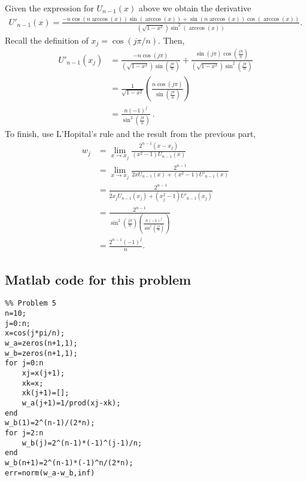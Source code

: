Given the expression for $U_{n-1}(x)$ above we obtain the derivative
\begin{align*}
U'_{n-1}(x) = \frac{-n\cos(n\arccos(x))\sin(\arccos(x)) + \sin(n\arccos(x))\cos(\arccos(x))}{\left(\sqrt{1 - x^2}\right)\sin^2(\arccos(x))}.
\end{align*}
Recall the definition of $x_j=\cos(j\pi/n)$. Then,
\begin{align*}
U'_{n-1}(x_j) & = \frac{-n\cos(j \pi)}{\left(\sqrt{1 - x^2}\right) \sin(\frac{j \pi}{n})} + \frac{\sin(j \pi) \cos(\frac{j \pi}{n})}{\left(\sqrt{1 - x^2}\right)\sin^2(\frac{j \pi}{n})}  \\
&= \frac{1}{\sqrt{1 - x^2}} \left( \frac{n\cos(j\pi)}{\sin(\frac{j \pi}{n})} \right) \\
& = \frac{n(-1)^j}{\sin^2(\frac{j \pi}{n})}~.
\end{align*}
To finish, use L'Hopital's rule and the result from the previous part,
\begin{align*}
w_j & = \lim_{x \rightarrow x_j} \frac{2^{n-1}(x-x_j)}{(x^2 - 1)U_{n-1}(x)} \\ &= \lim_{x \rightarrow x_j} \frac{2^{n-1}}{2xU_{n-1}(x)+(x^2 -1)U'_{n-1}(x)} \\
& = \frac{2^{n-1}}{2x_jU_{n-1}(x_j)+(x_j^2 -1)U'_{n-1}(x_j)} \\
& = \frac {2^{n-1}}{\sin^2(\frac{j\pi}{n})\left( \frac{n(-1)^j}{\sin^2(\frac{j\pi}{n})}\right)} \\
& = \frac{2^{n-1}(-1)^j}{n}.
\end{align*}

\subsection*{Matlab code for this problem}
\begin{verbatim}
%% Problem 5
n=10;
j=0:n;
x=cos(j*pi/n);
w_a=zeros(n+1,1);
w_b=zeros(n+1,1);
for j=0:n
    xj=x(j+1);
    xk=x;
    xk(j+1)=[];
    w_a(j+1)=1/prod(xj-xk);
end
w_b(1)=2^(n-1)/(2*n);
for j=2:n
    w_b(j)=2^(n-1)*(-1)^(j-1)/n;
end
w_b(n+1)=2^(n-1)*(-1)^n/(2*n);
err=norm(w_a-w_b,inf)
\end{verbatim}